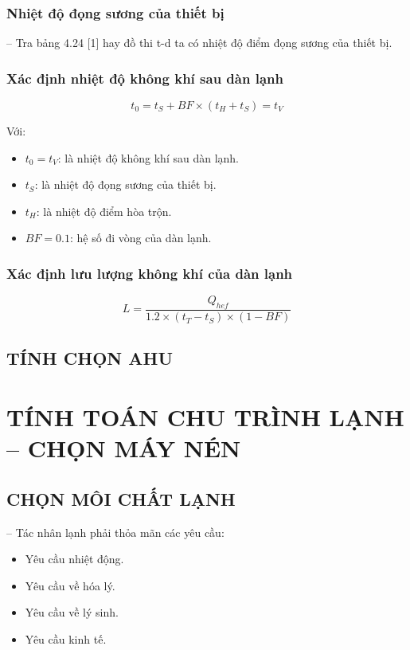 \subsubsection{Nhiệt độ đọng sương của thiết bị}
-- Tra bảng 4.24 [1] hay đồ thi t-d ta có nhiệt độ điểm đọng sương của thiết bị.
\subsubsection{Xác định nhiệt độ không khí sau dàn lạnh}
\begin{equation*}
	t_{0} = t_{S} + BF\times (t_{H} + t_{S}) = t_{V}
\end{equation*}

Với:
\begin{itemize}
	\item $t_{0} = t_{V}$: là nhiệt độ không khí sau dàn lạnh.
	\item $t_{S}$: là nhiệt độ đọng sương của thiết bị.
	\item $t_{H}$:  là nhiệt độ điểm hòa trộn.
	\item $BF = 0.1$: hệ số đi vòng của dàn lạnh.
\end{itemize}
\subsubsection{Xác định lưu lượng không khí của dàn lạnh}
\begin{equation*}
	L = \dfrac{Q_{hef}}{1.2\times (t_{T} - t_{S})\times (1-BF)}
\end{equation*}

\subsection{TÍNH CHỌN AHU}
\section{TÍNH TOÁN CHU TRÌNH LẠNH – CHỌN MÁY NÉN}
\subsection{CHỌN MÔI CHẤT LẠNH}
-- Tác nhân lạnh phải thỏa mãn các yêu cầu:
\begin{itemize}
	\item Yêu cầu nhiệt động.
	\item Yêu cầu về hóa lý.
	\item Yêu cầu về lý sinh.
	\item Yêu cầu kinh tế.
\end{itemize}

